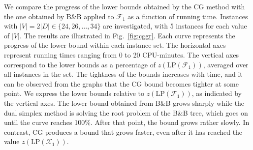 We compare the progress of the lower bounds obtained by the CG method with the one obtained by B\&B applied to $\mathcal{F}_1$ as a function of running time.
Instances with $|V|=2|D|\in\{24, 26,\ldots, 34\}$ are investigated, with 5 instances for each value of $|V|$.
The results are illustrated in Fig.\ \ref{fig:cggr}.
Each curve represents the progress of the lower bound within each instance set.
The horizontal axes represent running times ranging from 0 to 20 CPU-minutes.
The vertical axes correspond to the lower bounds as a percentage of $z\left(\text{LP}(\mathcal{F}_1)\right)$, averaged over all instances in the set.
The tightness of the bounds increases with time, and it can be observed from the graphs that the CG bound becomes tighter at some point.
We express the lower bounds relative to $z\left(\text{LP}(\mathcal{F}_1)\right)$, as indicated by the vertical axes.
The lower bound obtained from B\&B grows sharply while the dual simplex method is solving the root problem of the B\&B tree, 
which goes on until the curve reaches 100\%.
After that point, the bound grows rather slowly.
In contrast, CG produces a bound that grows faster, even after it has reached the value $z\left(\text{LP}(\mathcal{X}_1)\right)$.

